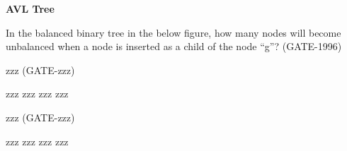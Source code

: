 
\centerline{\textbf{ \LARGE AVL Tree}}

\begin{questyle}
  \question  In the balanced binary tree in the below figure, how many nodes will become unbalanced when a
             node is inserted as a child of the node “g”?  (GATE-1996)

  \begin{choices}
  \end{choices}
\end{questyle}

\begin{questyle}
  \question  zzz  (GATE-zzz)

  \begin{choices}
    \choice         zzz
    \choice         zzz
    \choice         zzz
    \choice         zzz
    \CorrectChoice
  \end{choices}
\end{questyle}

\begin{questyle}
  \question  zzz  (GATE-zzz)

  \begin{choices}
    \choice         zzz
    \choice         zzz
    \choice         zzz
    \choice         zzz
    \CorrectChoice
  \end{choices}
\end{questyle}
